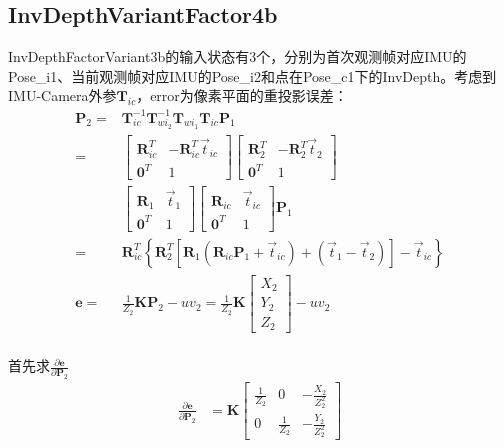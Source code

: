 \documentclass{article}
\begin{document}
\subsection{InvDepthVariantFactor4b}
InvDepthFactorVariant3b的输入状态有3个，分别为首次观测帧对应IMU的Pose\_i1、当前观测帧对应IMU的Pose\_i2和点在Pose\_c1下的InvDepth。考虑到IMU-Camera外参$\boldsymbol{T}_{ic}$，error为像素平面的重投影误差：
\begin{equation}
	\begin{aligned}
		\boldsymbol{P}_2  = & \boldsymbol{T}_{ic}^{-1}\boldsymbol{T}_{wi_2}^{-1}\boldsymbol{T}_{wi_1}\boldsymbol{T}_{ic}\boldsymbol{P}_1 \\=&
		\left[
		\begin{matrix}
		\boldsymbol{R}_{ic}^T & -\boldsymbol{R}_{ic}^T\vec{t}_{ic} \\
		\boldsymbol{0}^T & 1
		\end{matrix}
		\right]
		\left[
		\begin{matrix}
		\boldsymbol{R}_2^T & -\boldsymbol{R}_2^T\vec{t}_2 \\
		\boldsymbol{0}^T & 1
		\end{matrix}
		\right] \\&
		\left[
		\begin{matrix}
		\boldsymbol{R}_1 & \vec{t}_1 \\
		\boldsymbol{0}^T & 1
		\end{matrix}
		\right]
		\left[
		\begin{matrix}
		\boldsymbol{R}_{ic} & \vec{t}_{ic} \\
		\boldsymbol{0}^T & 1
		\end{matrix}
		\right]\boldsymbol{P}_1
		\\=&
		\boldsymbol{R}_{ic}^T\left\{\boldsymbol{R}_2^{T}[\boldsymbol{R}_1(\boldsymbol{R}_{ic}\boldsymbol{P}_1+\vec{t}_{ic} )+(\vec{t}_1-\vec{t}_2)]-\vec{t}_{ic} \right\}\\
		\boldsymbol {e}       =&\frac{1}{Z_2}\boldsymbol K\boldsymbol{P}_2 -uv_2 =\frac{1}{Z_2}\boldsymbol K                               
		\left[
		\begin{matrix}
		X_2 \\
		Y_2 \\
		Z_2 
		\end{matrix}
		\right]-uv_2 \\
	\end{aligned}
\end{equation}

首先求$\frac {\partial{\boldsymbol{e}}}{\partial{\boldsymbol{P}_2}}$
\begin{equation}
	\begin{aligned}
		\frac {\partial{\boldsymbol{e}}}{\partial{\boldsymbol{P}_2}}&=\boldsymbol K 
		\left[
		\begin{matrix}
		\frac{1}{Z_2} & 0             & -\frac{X_2}{Z_2^2} \\
		0             & \frac{1}{Z_2} & -\frac{Y_2}{Z_2^2} 
		\end{matrix}
		\right]
	\end{aligned}
\end{equation} 
\end{document}
